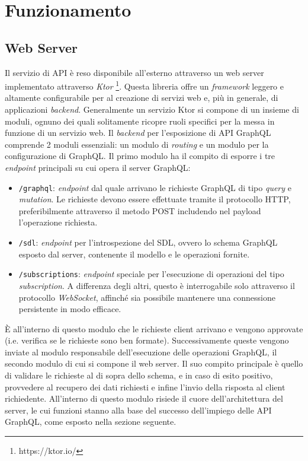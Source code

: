 \section{Funzionamento}\label{sec:functioning}
\subsection{Web Server}\label{ssec:web-server}
Il servizio di \ac{API} è reso disponibile all'esterno attraverso un web server implementato attraverso \textit{Ktor} \footnote{https://ktor.io/}. Questa libreria
offre un \textit{framework} leggero e altamente configurabile per al creazione di servizi web e, più in generale, di applicazioni \textit{backend}. Generalmente un
servizio Ktor si compone di un insieme di moduli, ognuno dei quali solitamente ricopre ruoli specifici per la messa in funzione di un servizio web. Il \textit{backend}
per l'esposizione di \ac{API} GraphQL comprende 2 moduli essenziali: un modulo di \textit{routing} e un modulo per la configurazione di GraphQL.
Il primo modulo ha il compito di esporre i tre \textit{endpoint} principali su cui opera il server GraphQL:
\begin{itemize}
    \item \texttt{/graphql}: \textit{endpoint} dal quale arrivano le richieste GraphQL di tipo \textit{query} e \textit{mutation}. Le richieste devono
        essere effettuate tramite il protocollo HTTP, preferibilmente attraverso il metodo POST includendo nel payload l'operazione richiesta.
    \item \texttt{/sdl}: \textit{endpoint} per l'introspezione del \ac{SDL}, ovvero lo schema GraphQL esposto dal server, contenente il modello e le operazioni fornite.
    \item \texttt{/subscriptions}: \textit{endpoint} speciale per l'esecuzione di operazioni del tipo \textit{subscription}. A differenza degli altri, questo è interrogabile
        solo attraverso il protocollo \textit{WebSocket}, affinché sia possibile mantenere una connessione persistente in modo efficace.
\end{itemize}

È all'interno di questo modulo che le richieste client arrivano e vengono approvate (i.e. verifica se le richieste sono ben formate). Successivamente queste vengono inviate
al modulo responsabile dell'esecuzione delle operazioni GraphQL, il secondo modulo di cui si compone il web server. Il suo compito principale è quello di validare le richieste
al di sopra dello schema, e in caso di esito positivo, provvedere al recupero dei dati richiesti e infine l'invio della risposta al client richiedente. All'interno di questo modulo
risiede il cuore dell'architettura del server, le cui funzioni stanno alla base del successo dell'impiego delle \ac{API} GraphQL, come esposto nella sezione seguente.

